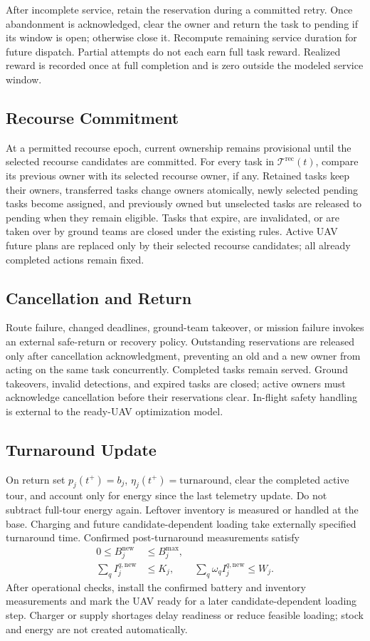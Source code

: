 \documentclass[conference]{IEEEtran}
\begin{document}
After incomplete service, retain the reservation during a committed retry. Once abandonment is acknowledged, clear the owner and return the task to pending if its window is open; otherwise close it. Recompute remaining service duration for future dispatch. Partial attempts do not each earn full task reward. Realized reward is recorded once at full completion and is zero outside the modeled service window.

\subsection{Recourse Commitment}
At a permitted recourse epoch, current ownership remains provisional until the selected recourse candidates are committed. For every task in $\mathcal T^{\mathrm{rec}}(t)$, compare its previous owner with its selected recourse owner, if any. Retained tasks keep their owners, transferred tasks change owners atomically, newly selected pending tasks become assigned, and previously owned but unselected tasks are released to pending when they remain eligible. Tasks that expire, are invalidated, or are taken over by ground teams are closed under the existing rules. Active UAV future plans are replaced only by their selected recourse candidates; all already completed actions remain fixed.

\subsection{Cancellation and Return}
Route failure, changed deadlines, ground-team takeover, or mission failure invokes an external safe-return or recovery policy. Outstanding reservations are released only after cancellation acknowledgment, preventing an old and a new owner from acting on the same task concurrently. Completed tasks remain served. Ground takeovers, invalid detections, and expired tasks are closed; active owners must acknowledge cancellation before their reservations clear. In-flight safety handling is external to the ready-UAV optimization model.

\subsection{Turnaround Update}
On return set $p_j(t^+)=b_j$, $\eta_j(t^+)=\mathrm{turnaround}$, clear the completed active tour, and account only for energy since the last telemetry update. Do not subtract full-tour energy again. Leftover inventory is measured or handled at the base. Charging and future candidate-dependent loading take externally specified turnaround time. Confirmed post-turnaround measurements satisfy
\begin{align}
0\leq B_j^{\mathrm{new}}&\leq B_j^{\max},\\
\sum_q I_j^{q,\mathrm{new}}&\leq K_j,\qquad
\sum_q \omega_qI_j^{q,\mathrm{new}}\leq W_j.
\end{align}
After operational checks, install the confirmed battery and inventory measurements and mark the UAV ready for a later candidate-dependent loading step. Charger or supply shortages delay readiness or reduce feasible loading; stock and energy are not created automatically.
\end{document}

